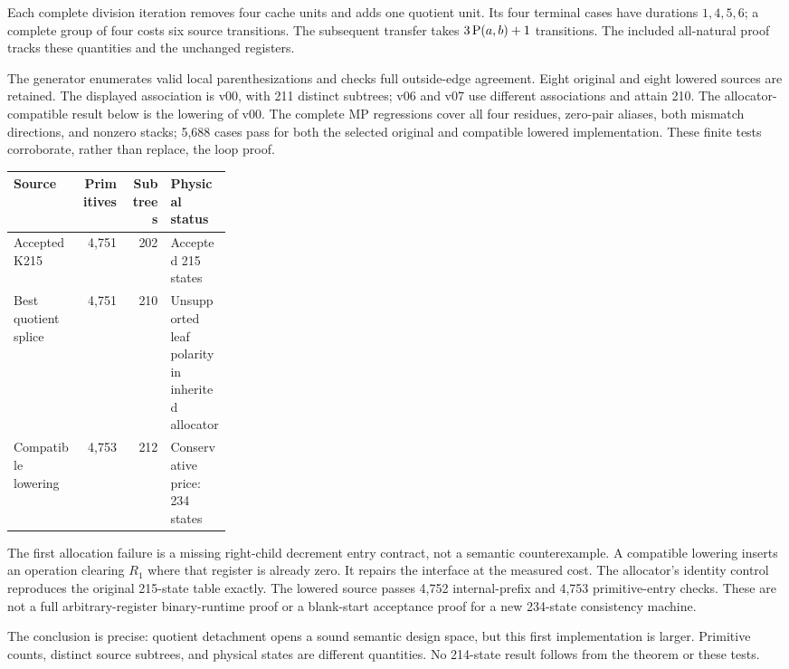 \documentclass[11pt]{article}
\begin{document}
Each complete division iteration removes four cache units and adds one quotient unit. Its four terminal cases have durations $1,4,5,6$; a complete group of four costs six source transitions. The subsequent transfer takes $3\operatorname{P}(a,b)+1$ transitions. The included all-natural proof tracks these quantities and the unchanged registers.

The generator enumerates valid local parenthesizations and checks full outside-edge agreement. Eight original and eight lowered sources are retained. The displayed association is v00, with 211 distinct subtrees; v06 and v07 use different associations and attain 210. The allocator-compatible result below is the lowering of v00. The complete MP regressions cover all four residues, zero-pair aliases, both mismatch directions, and nonzero stacks; 5,688 cases pass for both the selected original and compatible lowered implementation. These finite tests corroborate, rather than replace, the loop proof.

\begin{center}\begin{tabular}{lrrp{0.28\linewidth}}\toprule
Source & Primitives & Subtrees & Physical status \\\midrule
Accepted K215 & 4,751 & 202 & Accepted 215 states \\
Best quotient splice & 4,751 & 210 & Unsupported leaf polarity in inherited allocator \\
Compatible lowering & 4,753 & 212 & Conservative price: 234 states \\\bottomrule
\end{tabular}\end{center}

The first allocation failure is a missing right-child decrement entry contract, not a semantic counterexample. A compatible lowering inserts an operation clearing $R_1$ where that register is already zero. It repairs the interface at the measured cost. The allocator's identity control reproduces the original 215-state table exactly. The lowered source passes 4,752 internal-prefix and 4,753 primitive-entry checks. These are not a full arbitrary-register binary-runtime proof or a blank-start acceptance proof for a new 234-state consistency machine.

The conclusion is precise: quotient detachment opens a sound semantic design space, but this first implementation is larger. Primitive counts, distinct source subtrees, and physical states are different quantities. No 214-state result follows from the theorem or these tests.
\end{document}
